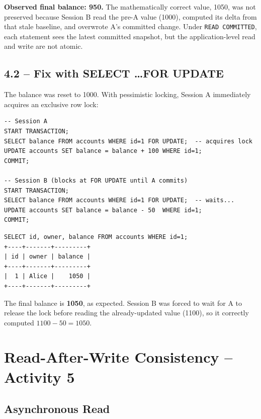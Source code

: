 \documentclass[12pt,a4paper]{article}
\begin{document}
\textbf{Observed final balance: 950.} The mathematically correct value, 1050,
was not preserved because Session B read the pre-A value (1000), computed its
delta from that stale baseline, and overwrote A's committed change.  Under
\texttt{READ COMMITTED}, each statement sees the latest committed snapshot, but
the application-level read and write are not atomic.

\subsection{4.2 -- Fix with SELECT \ldots FOR UPDATE}

The balance was reset to 1000.  With pessimistic locking, Session A
immediately acquires an exclusive row lock:

\begin{lstlisting}[style=sqlstyle, caption={Serialized execution with FOR UPDATE.}]
-- Session A
START TRANSACTION;
SELECT balance FROM accounts WHERE id=1 FOR UPDATE;  -- acquires lock
UPDATE accounts SET balance = balance + 100 WHERE id=1;
COMMIT;

-- Session B (blocks at FOR UPDATE until A commits)
START TRANSACTION;
SELECT balance FROM accounts WHERE id=1 FOR UPDATE;  -- waits...
UPDATE accounts SET balance = balance - 50  WHERE id=1;
COMMIT;
\end{lstlisting}

\begin{lstlisting}[style=bashstyle, caption={Final balance after locking fix.}]
SELECT id, owner, balance FROM accounts WHERE id=1;
+----+-------+---------+
| id | owner | balance |
+----+-------+---------+
|  1 | Alice |    1050 |
+----+-------+---------+
\end{lstlisting}

The final balance is \textbf{1050}, as expected.  Session B was forced to
wait for A to release the lock before reading the already-updated value (1100),
so it correctly computed $1100 - 50 = 1050$.

\section{Read-After-Write Consistency -- Activity 5}

\subsection{Asynchronous Read}
\end{document}
